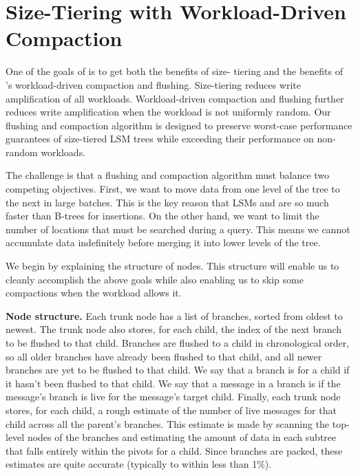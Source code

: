 \section{Size-Tiering with Workload-Driven Compaction}\label{sec:flush-compact}

One of the goals of \sysname is to get both the benefits of size-
tiering and the benefits of \bet's workload-driven compaction and
flushing.  Size-tiering reduces write amplification of all
workloads. Workload-driven compaction and flushing further reduces
write amplification when the workload is not uniformly random.
Our flushing and compaction algorithm is designed to preserve
worst-case performance guarantees of size-tiered LSM trees while
exceeding their performance on non-random workloads.  

The challenge is that a flushing and compaction algorithm must balance
two competing objectives.  First, we want to move data from one level
of the tree to the next in large batches.  This is the key reason
that LSMs and \bets are so much faster than B-trees for insertions.
On the other hand, we want to limit the number of locations that must
be searched during a query.  This means we cannot accumulate data
indefinitely before merging it into lower levels of the tree.

We begin by explaining the structure of \datastruct nodes.  This
structure will enable us to cleanly accomplish the above goals while
also enabling us to skip some compactions when the workload allows
it.

\textbf{Node structure.}  Each trunk node has a list of branches,
sorted from oldest to newest.  The trunk node also stores, for each
child, the index of the next branch to be flushed to that child.
Branches are flushed to a child in chronological order, so all older
branches have already been flushed to that child, and all newer
branches are yet to be flushed to that child.  We say that a branch is
 for a child if it hasn't been flushed to that child.  We
say that a message in a branch is  if the message's branch
is live for the message's target child.  Finally, each trunk node
stores, for each child, a rough estimate of the number of live
messages for that child across all the parent's branches.  This
estimate is made by scanning the top-level nodes of the branches and
estimating the amount of data in each subtree that falls entirely
within the pivots for a child.  Since branches are packed, these
estimates are quite accurate (typically to within less than 1\%).

